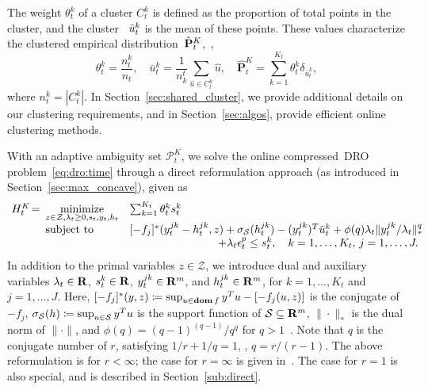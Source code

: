 The weight $\theta^k_t$ of a cluster $C^k_t$ is defined as the proportion of total points in the cluster, and the cluster ~$\bar{u}^k_t$ is the mean of these points. These values characterize the clustered empirical distribution~$\hat{{\mathbf P}}^K_t$,~\ie,
$$\theta_t^k = \frac{n^k_t}{n_t},\quad \bar{u}^k_t = \frac{1}{n^t_k} \sum_{\hat{u} \in C^k_t} \hat{u},\quad \hat{\mathbf{P}}^K_t = \sum_{k=1}^{K_t}\theta_t^k\delta_{\bar{u}_t^k},$$ 
where $n^k_t = |C^k_t|$.
In Section~\ref{sec:shared_cluster}, we provide additional details on our clustering requirements, and in Section~\ref{sec:algos}, provide efficient online clustering methods. 

With an adaptive ambiguity set $\mathcal{P}^K_{t}$, we solve the online compressed~\gls{DRO} problem~\eqref{eq:dro:time} through a direct reformulation approach (as introduced in Section~\ref{sec:max_concave}), given as
\begin{equation}
	 \label{c3:eq:robustopt_p_max}
	\begin{array}{lll}
 \!\!H^K_t \!= \!\!\!&\underset{z\in\mathcal{Z},\lambda_t\geq0,s_t,y_t,h_t}{\mbox{minimize}} & \sum_{k=1}^{K_t} \theta^k_{t} s^k_t\\
&\mbox{subject to}  & [-f_j]^*(y^{jk}_t-h^{jk}_t , z) + \sigma_{{\supp}}(h^{jk}_t) - (y{^{jk}_t})^T\bar{\unc}^k_{t} + \phi(q)\lambda_t \|y^{jk}_t/ \lambda_t \|_*^q   \\
	&	&\hspace{8em}   +\lambda_t \epsnom_{t}^p \leq s^k_t,\quad k = 1,\dots, K_t, \, j =1, \dots, J.\\	\end{array}\!\!\!\!\!\!\!\!\!\!\!\!\!
\end{equation}
In addition to the primal variables $z \in \mathcal{Z}$, we introduce dual and auxiliary variables $\lambda_t \in {\mathbf R}$, $s^k_t \in {\mathbf R}$, $y^{jk}_t \in {\mathbf R}^{m}$, and $h^{jk}_t \in {\mathbf R}^m$, for $k=1,\dots,K_t$ and $j=1,\dots,J$.
Here, $[-f_j]^*(y, z) \coloneqq \sup_{u\in \mathop{\bf dom} f} y^Tu - [-f_j(u, z)] $ is the conjugate of $-f_j$, $\sigma_{\mathcal{S}}(h) \coloneqq\sup_{u \in  \mathcal{S}}  y^Tu$ is the support function of $ \mathcal{S} \subseteq \mathbf{R}^m$, $\| \cdot \|_*$ is the dual norm of  $\| \cdot \|$, and $\phi(q) = (q-1)^{(q-1)}/q^q$ for $q > 1$~\cite[Theorem 8]{kuhn2019wasserstein}.
Note that $q$ is the conjugate number of $r$, satisfying $1/r + 1/q = 1$, \ie, $q = r/(r - 1)$. The above reformulation is for $r <\infty$; the case for $r = \infty$ is given in~\cite[Appendix B]{mro}. The case for $r = 1$ is also special, and is described in Section~\ref{sub:direct}.

